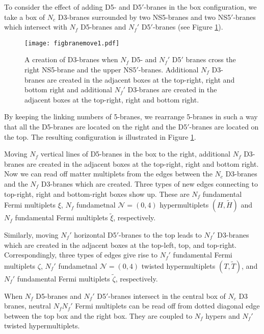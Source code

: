 \documentclass{article}
\numberwithin{equation}{section}
\begin{document}
To consider the effect of adding D5- and D5$'$-branes in the box configuration, 
we take a box of $N_{c}$ D3-branes surrounded by two NS5-branes and two NS5$'$-branes which
intersect with $N_{f}$ D5-branes and $N_{f}'$ D5$'$-branes (see Figure \ref{figbranemove1}). 
\begin{figure}
\begin{center}
\texttt{[image: figbranemove1.pdf]}
\vspace*{0.5cm}
\caption{
A creation of D3-branes when $N_{f}$ D5- and $N_{f}'$ D5$'$ branes cross the right NS5-brane and the upper NS5$'$-branes. 
Additional $N_{f}$ D3-branes are created in the adjacent boxes at the top-right, right and bottom right 
and additional $N_{f}'$ D3-branes are created in the adjacent boxes at the top-right, right and bottom right. 
}
\label{figbranemove1}
\end{center}
\end{figure}
By keeping the linking numbers of 5-branes, 
we rearrange 5-branes in such a way that 
all the D5-branes are located on the right and the D5$'$-branes are located on the top. 
The resulting configuration is illustrated in Figure \ref{figbranemove1}. 



Moving $N_{f}$ vertical lines of D5-branes in the box to the right, 
additional $N_{f}$ D3-branes are created in the adjacent boxes at the top-right, right and bottom right. 
Now we can read off matter multiplets from the edges between the $N_{c}$ D3-branes and the $N_f$ D3-branes which are created. 
Three types of new edges connecting to top-right, right and bottom-right boxes show up.
These are $N_{f}$ fundamental Fermi multiplets $\xi$, 
$N_{f}$ fundametnal $\mathcal{N}=(0,4)$ hypermultiplets $(H,\widetilde{H})$ 
and $N_{f}$ fundamental Fermi multiplets $\widetilde{\xi}$, respectively. 

Similarly, moving $N_{f}'$ horizontal D5$'$-branes to the top leads to
$N_{f}'$ D3-branes which are created in the adjacent boxes at the top-left, top, and top-right. 
Correspondingly, three types of edges give rise to
$N_{f}'$ fundamental Fermi multiplets $\zeta$, 
$N_{f}'$ fundametnal $\mathcal{N}=(0,4)$ twisted hypermultiplets $(T, \widetilde{T})$,
and $N_{f}'$ fundamental  Fermi multiplets $\widetilde{\zeta}$, respectively. 


When $N_{f}$ D5-branes and  $N_{f}'$ D5$'$-branes intersect in the central box of $N_{c}$ D3 branes, 
neutral $N_{f}N_{f}'$ Fermi multiplets can be read off from dotted diagonal edge between the top box and the right box. 
They are coupled to $N_{f}$ hypers and $N_{f}'$ twisted hypermultiplets. 
\end{document}
